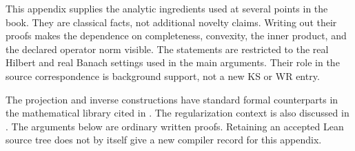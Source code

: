 \clearpage
{}\label{app:proof-tools}
This appendix supplies the analytic ingredients used at several points in the book. They are classical facts, not additional novelty claims. Writing out their proofs makes the dependence on completeness, convexity, the inner product, and the declared operator norm visible. The statements are restricted to the real Hilbert and real Banach settings used in the main arguments. Their role in the source correspondence is background support, not a new KS or WR entry.

The projection and inverse constructions have standard formal counterparts in the mathematical library cited in \cite{mathlib-projection,mathlib-banach}. The regularization context is also discussed in \cite{clason-inverse}. The arguments below are ordinary written proofs. Retaining an accepted Lean source tree does not by itself give a new compiler record for this appendix.

